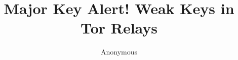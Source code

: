 \documentclass{sig-alternate-10pt}
\title{Major Key Alert! Weak Keys in Tor Relays}
\begin{document}

\author{
	\alignauthor Anonymous
}

\maketitle




















\printbibliography


\end{document}
